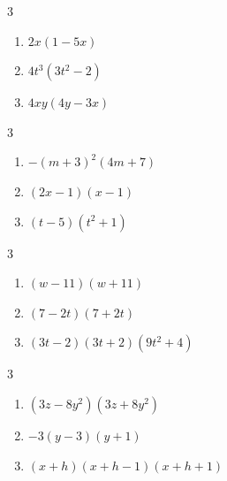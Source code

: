 \documentclass{ximera}
\begin{document}
	\author{Stitz-Zeager}


\begin{multicols}{3}
\begin{enumerate}

\item $2x(1 - 5x)$ 
\item $4t^3(3t^2-2)$
\item $4xy(4y-3x)$

\setcounter{HW}{\value{enumi}}
\end{enumerate}
\end{multicols}

\begin{multicols}{3}
\begin{enumerate}
\setcounter{enumi}{\value{HW}}

\item $-(m+3)^2(4m+7)$
\item $(2x-1)(x-1)$
\item $(t-5)(t^2+1)$

\setcounter{HW}{\value{enumi}}
\end{enumerate}
\end{multicols}

\begin{multicols}{3}
\begin{enumerate}
\setcounter{enumi}{\value{HW}}

\item $(w-11)(w+11)$
\item $(7-2t)(7+2t)$
\item $(3t-2)(3t+2)(9t^2+4)$

\setcounter{HW}{\value{enumi}}
\end{enumerate}
\end{multicols}

\begin{multicols}{3}
\begin{enumerate}
\setcounter{enumi}{\value{HW}}

\item $(3z-8y^2)(3z+8y^2)$
\item $-3(y - 3)(y+1)$
\item $(x+h)(x+h-1)(x+h+1)$

\setcounter{HW}{\value{enumi}}
\end{enumerate}
\end{multicols}
\end{document}
